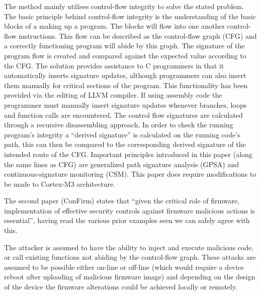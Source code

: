 The method mainly utilises control-flow integrity to solve the stated problem. The basic principle behind control-flow integrity is the understanding of the basic blocks of a making up a program. The blocks will flow into one another control-flow instructions. This flow can be described as the control-flow graph (CFG) and a correctly functioning program will abide by this graph. The signature of the program flow is created and compared against the expected value according to the CFG. The solution provides assistance to C programmers in that it automatically inserts signature updates, although programmers can also insert them manually for critical sections of the program. This functionality has been provided via the editing of LLVM compiler. If using assembly code the programmer must manually insert signature updates whenever branches, loops and function calls are encountered. The control flow signatures are calculated through a  recursive disassembling approach. In order to check the running  program's integrity a ``derived signature'' is calculated on the running code's path, this can then be compared to the corresponding derived signature of the intended route of the CFG. Important principles introduced in this paper (along the same lines as CFG) are generalized path signature analysis (GPSA) and continuous-signature monitoring (CSM). This paper does require modifications to be made to Cortex-M3 architecture.

\ifnotesincluded
{} 


\fi

The second paper \cite{Wang2016} (ConFirm) states that ``given the critical role of firmware, implementation of effective security controls against firmware malicious actions is essential'', having read the various prior examples seen we can safely agree with this. 

The attacker is assumed to have the ability to inject and execute malicious code, or call existing functions not abiding by the control-flow graph. These attacks are assumed to be possible either on-line or off-line (which would require a device reboot after uploading of malicious firmware image) and depending on the design of the device the firmware alterations could be achieved locally or remotely.


